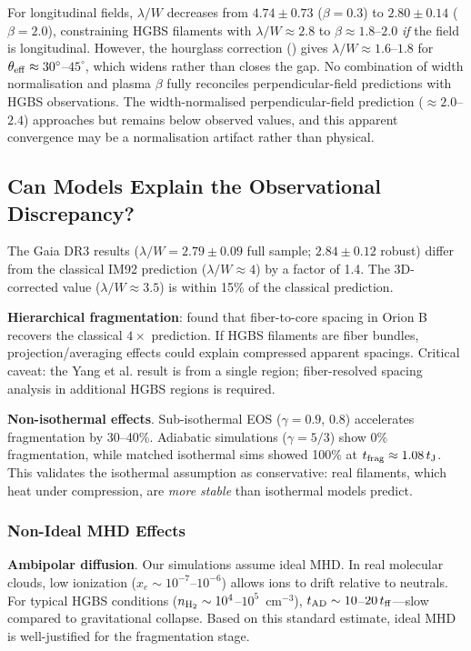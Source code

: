 \documentclass[twocolumn,longtitle,usenatbib]{mnras}
\begin{document}
For longitudinal fields, $\lambda/W$ decreases from $4.74 \pm 0.73$ ($\beta = 0.3$) to $2.80 \pm 0.14$ ($\beta = 2.0$), constraining HGBS filaments with $\lambda/W \approx 2.8$ to $\beta \approx 1.8$--$2.0$ \textit{if} the field is longitudinal. However, the hourglass correction (\citet{Jadhav2026}) gives $\lambda/W \approx 1.6$--$1.8$ for $\theta_{\rm eff} \approx 30^{\circ}$--$45^{\circ}$, which widens rather than closes the gap. No combination of width normalisation and plasma $\beta$ fully reconciles perpendicular-field predictions with HGBS observations. The width-normalised perpendicular-field prediction ($\approx 2.0$--$2.4$) approaches but remains below observed values, and this apparent convergence may be a normalisation artifact rather than physical.

\subsection{Can Models Explain the Observational Discrepancy?}

The Gaia DR3 results ($\lambda/W = 2.79 \pm 0.09$ full sample; $2.84 \pm 0.12$ robust) differ from the classical IM92 prediction ($\lambda/W \approx 4$) by a factor of 1.4. The 3D-corrected value ($\lambda/W \approx 3.5$) is within 15\% of the classical prediction.

\textbf{Hierarchical fragmentation}: \citet{Yang2024} found that fiber-to-core spacing in Orion B recovers the classical $4\times$ prediction. If HGBS filaments are fiber bundles, projection/averaging effects could explain compressed apparent spacings. Critical caveat: the Yang et al. result is from a single region; fiber-resolved spacing analysis in additional HGBS regions is required.

\textbf{Non-isothermal effects}. Sub-isothermal EOS ($\gamma = 0.9$, $0.8$) accelerates fragmentation by 30--40\%. Adiabatic simulations ($\gamma = 5/3$) show 0\% fragmentation, while matched isothermal sims showed 100\% at $t_{\rm frag} \approx 1.08\,t_{\rm J}$. This validates the isothermal assumption as conservative: real filaments, which heat under compression, are {\it more stable} than isothermal models predict.

\subsubsection{Non-Ideal MHD Effects}

\textbf{Ambipolar diffusion}. Our simulations assume ideal MHD. In real molecular clouds, low ionization ($x_e \sim 10^{-7}$--$10^{-6}$) allows ions to drift relative to neutrals. For typical HGBS conditions ($n_{\rm H_2} \sim 10^4$--$10^5$~cm$^{-3}$), $t_{\rm AD} \sim 10$--$20\,t_{\rm ff}$---slow compared to gravitational collapse. Based on this standard estimate, ideal MHD is well-justified for the fragmentation stage.
\end{document}
